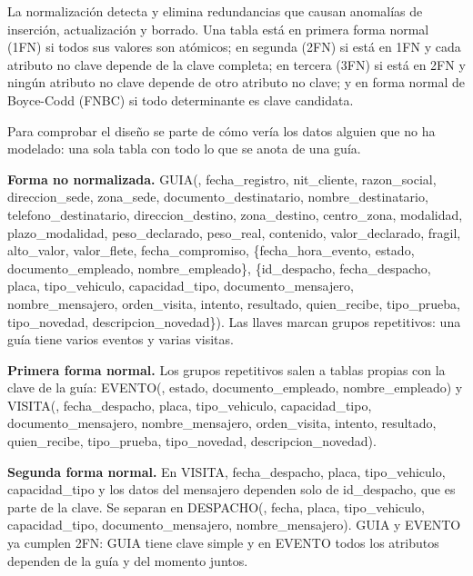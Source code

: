 La normalización detecta y elimina redundancias que causan anomalías de
inserción, actualización y borrado. Una tabla está en primera forma
normal (1FN) si todos sus valores son atómicos; en segunda (2FN) si
está en 1FN y cada atributo no clave depende de la clave completa; en
tercera (3FN) si está en 2FN y ningún atributo no clave depende de otro
atributo no clave; y en forma normal de Boyce-Codd (FNBC) si todo
determinante es clave candidata.

Para comprobar el diseño se parte de cómo vería los datos alguien que
no ha modelado: una sola tabla con todo lo que se anota de una guía.

\begin{sloppypar}\noindent\textbf{Forma no normalizada.} GUIA(, fecha\_registro,
nit\_cliente, razon\_social, direccion\_sede, zona\_sede,
documento\_destinatario, nombre\_destinatario, telefono\_destinatario,
direccion\_destino, zona\_destino, centro\_zona, modalidad,
plazo\_modalidad, peso\_declarado, peso\_real, contenido,
valor\_declarado, fragil, alto\_valor, valor\_flete, fecha\_compromiso,
\{fecha\_hora\_evento, estado, documento\_empleado, nombre\_empleado\},
\{id\_despacho, fecha\_despacho, placa, tipo\_vehiculo, capacidad\_tipo,
documento\_mensajero, nombre\_mensajero, orden\_visita, intento,
resultado, quien\_recibe, tipo\_prueba, tipo\_novedad,
descripcion\_novedad\}). Las llaves marcan grupos repetitivos: una guía
tiene varios eventos y varias visitas.\end{sloppypar}

\begin{sloppypar}\noindent\textbf{Primera forma normal.} Los grupos repetitivos salen a tablas
propias con la clave de la guía:
EVENTO(, estado, documento\_empleado,
nombre\_empleado) y VISITA(,
fecha\_despacho, placa, tipo\_vehiculo, capacidad\_tipo,
documento\_mensajero, nombre\_mensajero, orden\_visita, intento,
resultado, quien\_recibe, tipo\_prueba, tipo\_novedad,
descripcion\_novedad).\end{sloppypar}

\begin{sloppypar}\noindent\textbf{Segunda forma normal.} En VISITA, fecha\_despacho, placa,
tipo\_vehiculo, capacidad\_tipo y los datos del mensajero dependen solo
de id\_despacho, que es parte de la clave. Se separan en
DESPACHO(, fecha, placa, tipo\_vehiculo,
capacidad\_tipo, documento\_mensajero, nombre\_mensajero). GUIA y
EVENTO ya cumplen 2FN: GUIA tiene clave simple y en EVENTO todos los
atributos dependen de la guía y del momento juntos.\end{sloppypar}

